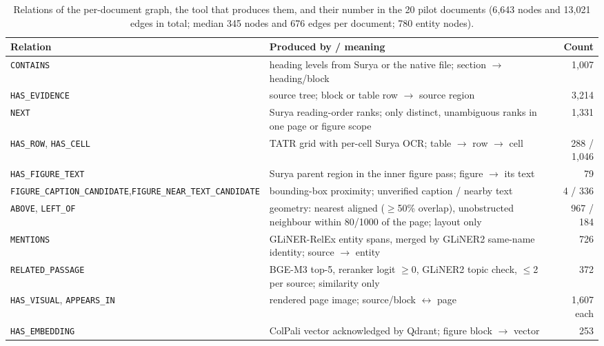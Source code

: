 \documentclass[conference]{IEEEtran}
\begin{document}
\begin{table}[t]
\centering\footnotesize
\caption{Relations of the per-document graph, the tool that produces them, and their number in the 20 pilot documents (6{,}643 nodes and 13{,}021 edges in total; median 345 nodes and 676 edges per document; 780 entity nodes).}
\label{tab:graph}
\setlength{\tabcolsep}{4pt}
\begin{tabular}{@{}p{}p{}r@{}}
\toprule
Relation & Produced by / meaning & Count \\
\midrule
\texttt{CONTAINS} & heading levels from Surya or the native file; section $\rightarrow$ heading/block & 1{,}007 \\
\texttt{HAS\_EVIDENCE} & source tree; block or table row $\rightarrow$ source region & 3{,}214 \\
\texttt{NEXT} & Surya reading-order ranks; only distinct, unambiguous ranks in one page or figure scope & 1{,}331 \\
\texttt{HAS\_ROW}, \texttt{HAS\_CELL} & TATR grid with per-cell Surya OCR; table $\rightarrow$ row $\rightarrow$ cell & 288 / 1{,}046 \\
\texttt{HAS\_FIGURE\_TEXT} & Surya parent region in the inner figure pass; figure $\rightarrow$ its text & 79 \\
\texttt{FIGURE\_CAPTION\_CANDIDATE},\newline \texttt{FIGURE\_NEAR\_TEXT\_CANDIDATE} & bounding-box proximity; unverified caption / nearby text & 4 / 336 \\
\texttt{ABOVE}, \texttt{LEFT\_OF} & geometry: nearest aligned ($\geq$50\% overlap), unobstructed neighbour within 80/1000 of the page; layout only & 967 / 184 \\
\texttt{MENTIONS} & GLiNER-RelEx entity spans, merged by GLiNER2 same-name identity; source $\rightarrow$ entity & 726 \\
\texttt{RELATED\_PASSAGE} & BGE-M3 top-5, reranker logit $\geq 0$, GLiNER2 topic check, $\leq$2 per source; similarity only & 372 \\
\texttt{HAS\_VISUAL}, \texttt{APPEARS\_IN} & rendered page image; source/block $\leftrightarrow$ page & 1{,}607 each \\
\texttt{HAS\_EMBEDDING} & ColPali vector acknowledged by Qdrant; figure block $\rightarrow$ vector & 253 \\
\bottomrule
\end{tabular}
\end{table}
\end{document}
